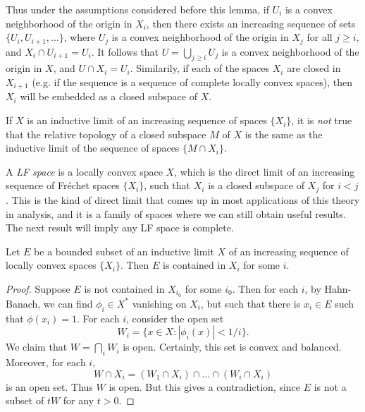 Thus under the assumptions considered before this lemma, if $U_i$ is a convex neighborhood of the origin in $X_i$, then there exists an increasing sequence of sets $\{ U_i, U_{i+1}, \dots \}$, where $U_j$ is a convex neighborhood of the origin in $X_j$ for all $j \geq i$, and $X_i \cap U_{i+1} = U_i$. It follows that $U = \bigcup_{j \geq i} U_j$ is a convex neighborhood of the origin in $X$, and $U \cap X_i = U_i$. Similarily, if each of the spaces $X_i$ are closed in $X_{i+1}$ (e.g. if the sequence is a sequence of complete locally convex spaces), then $X_i$ will be embedded as a closed subspace of $X$.

\begin{remark}
    If $X$ is an inductive limit of an increasing sequence of spaces $\{ X_i \}$, it is \emph{not} true that the relative topology of a closed subspace $M$ of $X$ is the same as the inductive limit of the sequence of spaces $\{ M \cap X_i \}$.
\end{remark}

A \emph{LF space} is a locally convex space $X$, which is the direct limit of an increasing sequence of Fr\'{e}chet spaces $\{ X_i \}$, such that $X_i$ is a closed subspace of $X_j$ for $i < j$. This is the kind of direct limit that comes up in most applications of this theory in analysis, and it is a family of spaces where we can still obtain useful results. The next result will imply any LF space is complete.

\begin{lemma}
    Let $E$ be a bounded subset of an inductive limit $X$ of an increasing sequence of locally convex spaces $\{ X_i \}$. Then $E$ is contained in $X_i$ for some $i$.
\end{lemma}
\begin{proof}
    Suppose $E$ is not contained in $X_{i_0}$ for some $i_0$. Then for each $i$, by Hahn-Banach, we can find $\phi_i \in X^*$ vanishing on $X_i$, but such that there is $x_i \in E$ such that $\phi(x_i) = 1$. For each $i$, consider the open set
    \[ W_i = \{ x \in X : |\phi_i(x)| < 1/i \}. \]
    We claim that $W = \bigcap_i W_i$ is open. Certainly, this set is convex and balanced. Moreover, for each $i$,
    \[ W \cap X_i = (W_1 \cap X_i) \cap \dots \cap (W_i \cap X_i) \]
    is an open set. Thus $W$ is open. But this gives a contradiction, since $E$ is not a subset of $tW$ for any $t > 0$.
\end{proof}

